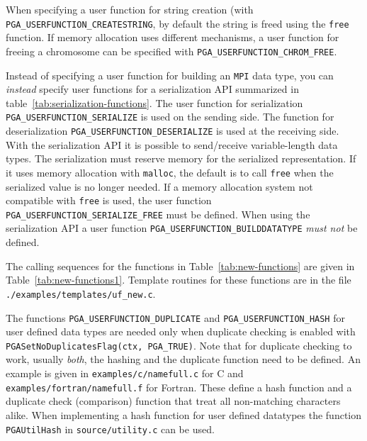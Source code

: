 \documentclass{report}
\begin{document}
When specifying a user function for string creation (with
\verb+PGA_USERFUNCTION_CREATESTRING+, by default the string is freed
using the \verb+free+ function. If memory allocation uses different
mechanisms, a user function for freeing a chromosome can be specified
with \verb+PGA_USERFUNCTION_CHROM_FREE+.

Instead of specifying a user function for building an \verb+MPI+ data
type, you can \textit{instead} specify user functions for a
serialization API summarized in table~\ref{tab:serialization-functions}.
The user function for serialization \verb+PGA_USERFUNCTION_SERIALIZE+
is used on the sending side. The function for deserialization
\verb+PGA_USERFUNCTION_DESERIALIZE+ is used at the receiving side.
With the serialization API it is possible to send/receive
variable-length data types. The serialization must reserve memory for
the serialized representation. If it uses memory allocation with
\verb+malloc+, the default is to call \verb+free+ when the serialized
value is no longer needed. If a memory allocation system not compatible
with \verb+free+ is used, the user function
\verb+PGA_USERFUNCTION_SERIALIZE_FREE+ must be defined.
When using the serialization API a user function
\verb+PGA_USERFUNCTION_BUILDDATATYPE+ \textit{must not} be defined.

The calling sequences for the functions in Table~\ref{tab:new-functions} are
given in Table~\ref{tab:new-functions1}. Template routines for these functions
are in the file \verb+./examples/templates/uf_new.c+.

The functions \verb+PGA_USERFUNCTION_DUPLICATE+ and
\verb+PGA_USERFUNCTION_HASH+ for user defined data types are needed only
when duplicate checking is enabled with
\verb+PGASetNoDuplicatesFlag(ctx, PGA_TRUE)+. Note that for duplicate
checking to work, usually \textit{both}, the hashing and the duplicate
function need to be defined. An example is given in
\verb+examples/c/namefull.c+ for C and
\verb+examples/fortran/namefull.f+ for Fortran. These define a hash
function and a duplicate check (comparison) function that treat all
non-matching characters alike. When implementing a hash function for
user defined datatypes the function \verb+PGAUtilHash+ in
\verb+source/utility.c+ can be used.
\end{document}
